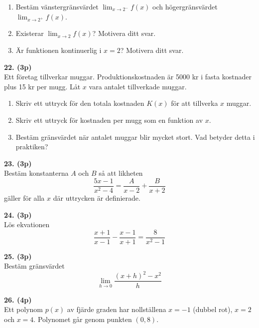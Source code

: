 \documentclass[12pt]{article}
\begin{document}
\begin{enumerate}[label=\alph*)]
    \item Bestäm vänstergränsvärdet $\lim_{x \to 2^-} f(x)$ och högergränsvärdet $\lim_{x \to 2^+} f(x)$.
    \item Existerar $\lim_{x \to 2} f(x)$? Motivera ditt svar.
    \item Är funktionen kontinuerlig i $x = 2$? Motivera ditt svar.
\end{enumerate}

\vspace{0.5cm}

\noindent
\textbf{22. (3p)} \\
Ett företag tillverkar muggar. Produktionskostnaden är 5000 kr i fasta kostnader plus 15 kr per mugg. Låt $x$ vara antalet tillverkade muggar.
\begin{enumerate}[label=\alph*)]
    \item Skriv ett uttryck för den totala kostnaden $K(x)$ för att tillverka $x$ muggar.
    \item Skriv ett uttryck för kostnaden per mugg som en funktion av $x$.
    \item Bestäm gränsvärdet när antalet muggar blir mycket stort. Vad betyder detta i praktiken?
\end{enumerate}

\vspace{0.5cm}

\noindent
\textbf{23. (3p)} \\
Bestäm konstanterna $A$ och $B$ så att likheten
\[
 \frac{5x - 1}{x^2 - 4} = \frac{A}{x - 2} + \frac{B}{x + 2}
\]
gäller för alla $x$ där uttrycken är definierade.

\vspace{0.5cm}

\noindent
\textbf{24. (3p)} \\
Lös ekvationen
\[
 \frac{x + 1}{x - 1} - \frac{x - 1}{x + 1} = \frac{8}{x^2 - 1}
\]

\vspace{0.5cm}

\noindent
\textbf{25. (3p)} \\
Bestäm gränsvärdet
\[
 \lim_{h \to 0} \frac{(x + h)^2 - x^2}{h}
\]

\vspace{0.5cm}

\noindent
\textbf{26. (4p)} \\
Ett polynom $p(x)$ av fjärde graden har nollställena $x = -1$ (dubbel rot), $x = 2$ och $x = 4$. Polynomet går genom punkten $(0, 8)$.
\end{document}
